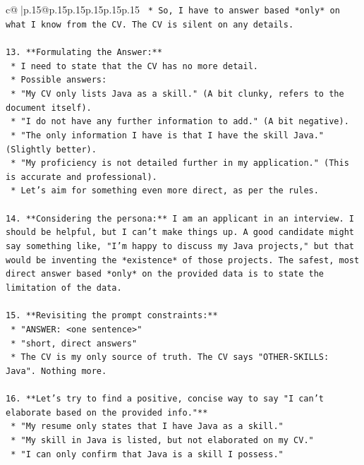 \documentclass{article}
\begin{document}
{\begin{supertabular}{c@{$\;$}|p{.15\linewidth}@{}p{.15\linewidth}p{.15\linewidth}p{.15\linewidth}p{.15\linewidth}p{.15\linewidth}}
{{{\texttt{    *   So, I have to answer based *only* on what I know from the CV. The CV is silent on any details.} \\
\\ 
\texttt{13. **Formulating the Answer:**} \\
\texttt{    *   I need to state that the CV has no more detail.} \\
\texttt{    *   Possible answers:} \\
\texttt{        *   "My CV only lists Java as a skill." (A bit clunky, refers to the document itself).} \\
\texttt{        *   "I do not have any further information to add." (A bit negative).} \\
\texttt{        *   "The only information I have is that I have the skill Java." (Slightly better).} \\
\texttt{        *   "My proficiency is not detailed further in my application." (This is accurate and professional).} \\
\texttt{        *   Let's aim for something even more direct, as per the rules.} \\
\\ 
\texttt{14. **Considering the persona:** I am an applicant in an interview. I should be helpful, but I can't make things up. A good candidate might say something like, "I'm happy to discuss my Java projects," but that would be inventing the *existence* of those projects. The safest, most direct answer based *only* on the provided data is to state the limitation of the data.} \\
\\ 
\texttt{15. **Revisiting the prompt constraints:**} \\
\texttt{    *   "ANSWER: <one sentence>"} \\
\texttt{    *   "short, direct answers"} \\
\texttt{    *   The CV is my only source of truth. The CV says "OTHER{-}SKILLS: Java". Nothing more.} \\
\\ 
\texttt{16. **Let's try to find a positive, concise way to say "I can't elaborate based on the provided info."**} \\
\texttt{    *   "My resume only states that I have Java as a skill."} \\
\texttt{    *   "My skill in Java is listed, but not elaborated on my CV."} \\
\texttt{    *   "I can only confirm that Java is a skill I possess."} \\
}}}
\end{supertabular}}
\end{document}
